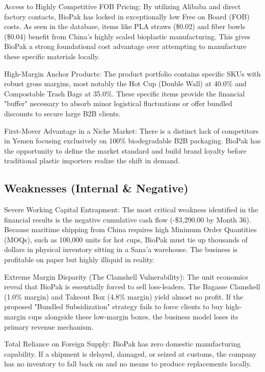 \documentclass[12pt,a4paper]{article}
\begin{document}
Access to Highly Competitive FOB Pricing: By utilizing Alibaba and direct factory contacts, BioPak has locked in exceptionally low Free on Board (FOB) costs. As seen in the database, items like PLA straws (\$0.02) and fiber bowls (\$0.04) benefit from China's highly scaled bioplastic manufacturing. This gives BioPak a strong foundational cost advantage over attempting to manufacture these specific materials locally.

High-Margin Anchor Products: The product portfolio contains specific SKUs with robust gross margins, most notably the Hot Cup (Double Wall) at 40.0\% and Compostable Trash Bags at 35.0\%. These specific items provide the financial "buffer" necessary to absorb minor logistical fluctuations or offer bundled discounts to secure large B2B clients.

First-Mover Advantage in a Niche Market: There is a distinct lack of competitors in Yemen focusing exclusively on 100\% biodegradable B2B packaging. BioPak has the opportunity to define the market standard and build brand loyalty before traditional plastic importers realize the shift in demand.

\subsection{Weaknesses (Internal \& Negative)}

Severe Working Capital Entrapment: The most critical weakness identified in the financial results is the negative cumulative cash flow (-\$3,290.00 by Month 36). Because maritime shipping from China requires high Minimum Order Quantities (MOQs), such as 100,000 units for hot cups, BioPak must tie up thousands of dollars in physical inventory sitting in a Sana'a warehouse. The business is profitable on paper but highly illiquid in reality.

Extreme Margin Disparity (The Clamshell Vulnerability): The unit economics reveal that BioPak is essentially forced to sell loss-leaders. The Bagasse Clamshell (1.0\% margin) and Takeout Box (4.8\% margin) yield almost no profit. If the proposed "Bundled Subsidization" strategy fails to force clients to buy high-margin cups alongside these low-margin boxes, the business model loses its primary revenue mechanism.

Total Reliance on Foreign Supply: BioPak has zero domestic manufacturing capability. If a shipment is delayed, damaged, or seized at customs, the company has no inventory to fall back on and no means to produce replacements locally.
\end{document}
